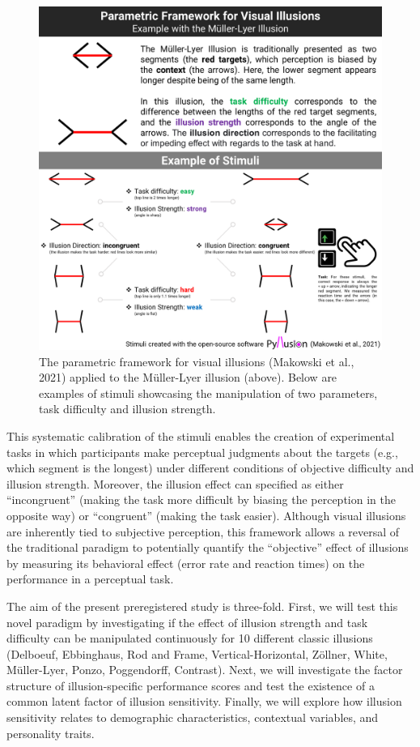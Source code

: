 \documentclass[
  man,floatsintext]{apa6}
\begin{document}
\begin{figure}
\includegraphics[width=1\linewidth]{../figures/Figure1} \caption{The parametric framework for visual illusions (Makowski et al., 2021) applied to the Müller-Lyer illusion (above). Below are examples of stimuli showcasing the manipulation of two parameters, task difficulty and illusion strength.}\label{fig:unnamed-chunk-2}
\end{figure}

This systematic calibration of the stimuli enables the creation of experimental tasks in which participants make perceptual judgments about the targets (e.g., which segment is the longest) under different conditions of objective difficulty and illusion strength. Moreover, the illusion effect can specified as either ``incongruent'' (making the task more difficult by biasing the perception in the opposite way) or ``congruent'' (making the task easier). Although visual illusions are inherently tied to subjective perception, this framework allows a reversal of the traditional paradigm to potentially quantify the ``objective'' effect of illusions by measuring its behavioral effect (error rate and reaction times) on the performance in a perceptual task.

The aim of the present preregistered study is three-fold. First, we will test this novel paradigm by investigating if the effect of illusion strength and task difficulty can be manipulated continuously for 10 different classic illusions (Delboeuf, Ebbinghaus, Rod and Frame, Vertical-Horizontal, Zöllner, White, Müller-Lyer, Ponzo, Poggendorff, Contrast). Next, we will investigate the factor structure of illusion-specific performance scores and test the existence of a common latent factor of illusion sensitivity. Finally, we will explore how illusion sensitivity relates to demographic characteristics, contextual variables, and personality traits.
\end{document}
